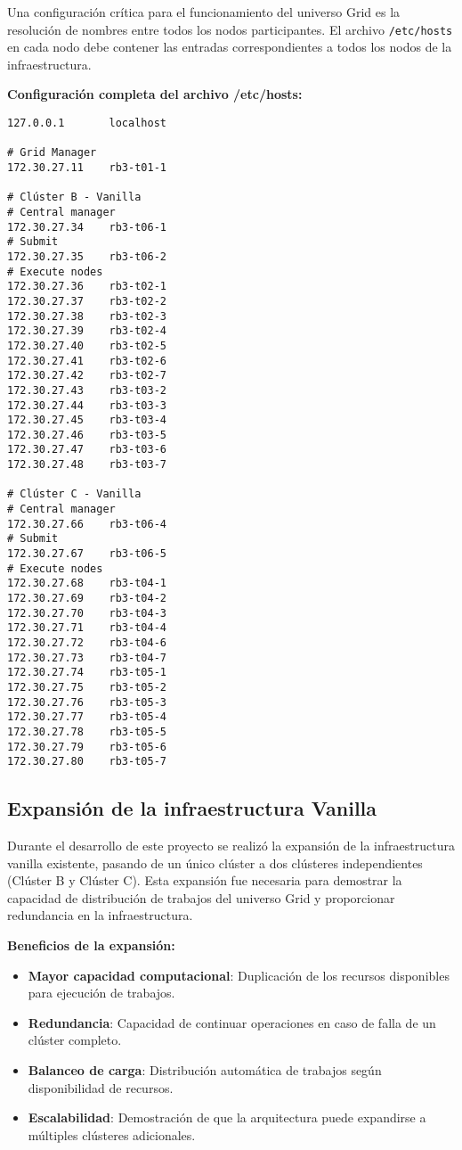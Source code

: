 Una configuración crítica para el funcionamiento del universo Grid es la resolución de nombres entre todos los nodos participantes. El archivo \texttt{/etc/hosts} en cada nodo debe contener las entradas correspondientes a todos los nodos de la infraestructura.

\textbf{Configuración completa del archivo /etc/hosts:}

\begin{verbatim}
127.0.0.1       localhost

# Grid Manager
172.30.27.11    rb3-t01-1

# Clúster B - Vanilla
# Central manager
172.30.27.34    rb3-t06-1
# Submit
172.30.27.35    rb3-t06-2
# Execute nodes
172.30.27.36    rb3-t02-1
172.30.27.37    rb3-t02-2
172.30.27.38    rb3-t02-3
172.30.27.39    rb3-t02-4
172.30.27.40    rb3-t02-5
172.30.27.41    rb3-t02-6
172.30.27.42    rb3-t02-7
172.30.27.43    rb3-t03-2
172.30.27.44    rb3-t03-3
172.30.27.45    rb3-t03-4
172.30.27.46    rb3-t03-5
172.30.27.47    rb3-t03-6
172.30.27.48    rb3-t03-7

# Clúster C - Vanilla
# Central manager
172.30.27.66    rb3-t06-4
# Submit
172.30.27.67    rb3-t06-5
# Execute nodes
172.30.27.68    rb3-t04-1
172.30.27.69    rb3-t04-2
172.30.27.70    rb3-t04-3
172.30.27.71    rb3-t04-4
172.30.27.72    rb3-t04-6
172.30.27.73    rb3-t04-7
172.30.27.74    rb3-t05-1
172.30.27.75    rb3-t05-2
172.30.27.76    rb3-t05-3
172.30.27.77    rb3-t05-4
172.30.27.78    rb3-t05-5
172.30.27.79    rb3-t05-6
172.30.27.80    rb3-t05-7
\end{verbatim}

\FloatBarrier\subsection{Expansión de la infraestructura Vanilla}

Durante el desarrollo de este proyecto se realizó la expansión de la infraestructura vanilla existente, pasando de un único clúster a dos clústeres independientes (Clúster B y Clúster C). Esta expansión fue necesaria para demostrar la capacidad de distribución de trabajos del universo Grid y proporcionar redundancia en la infraestructura.

\textbf{Beneficios de la expansión:}

\begin{itemize}
	\item \textbf{Mayor capacidad computacional}: Duplicación de los recursos disponibles para ejecución de trabajos.
	
	\item \textbf{Redundancia}: Capacidad de continuar operaciones en caso de falla de un clúster completo.
	
	\item \textbf{Balanceo de carga}: Distribución automática de trabajos según disponibilidad de recursos.
	
	\item \textbf{Escalabilidad}: Demostración de que la arquitectura puede expandirse a múltiples clústeres adicionales.
\end{itemize}

